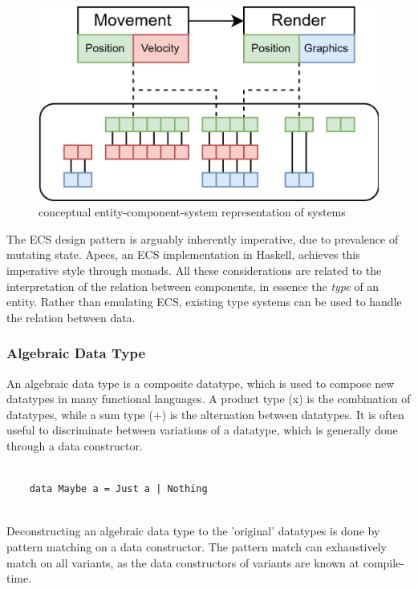 \documentclass{article}
\begin{document}
\begin{figure}[ht]
    \centering
    \includegraphics[scale=0.2]{ecs}
    \caption{ conceptual entity-component-system representation of systems }
\end{figure}

The ECS design pattern is arguably inherently imperative, due to prevalence of mutating state. 
Apecs, an ECS implementation in Haskell, achieves this imperative style through monads\cite{ecs-apecs}.
All these considerations are related to the interpretation of the relation between components, in essence the {\it type} of an entity. 
Rather than emulating ECS, existing type systems can be used to handle the relation between data.

\newpage

\subsubsection{Algebraic Data Type}

An algebraic data type is a composite datatype, which is used to compose new datatypes in many functional languages.
A product type (x) is the combination of datatypes, while a sum type (+) is the alternation between datatypes.
It is often useful to discriminate between variations of a datatype, which is generally done through a data constructor. 

\begin{verbatim}
    
    data Maybe a = Just a | Nothing
    
\end{verbatim}

Deconstructing an algebraic data type to the 'original' datatypes is done by pattern matching on a data constructor.
The pattern match can exhaustively match on all variants, as the data constructors of variants are known at compile-time.
\end{document}
